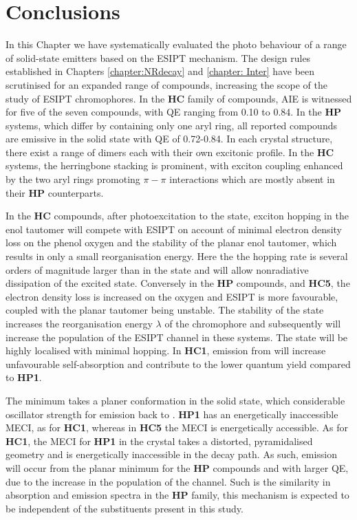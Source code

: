 \section{Conclusions}\label{section: Connecting_Conclusions}
In this Chapter we have systematically evaluated the photo behaviour of a range of solid-state emitters based on the ESIPT mechanism. The design rules established in Chapters \ref{chapter:NRdecay} and \ref{chapter: Inter} have been scrutinised for an expanded range of compounds, increasing the scope of the study of ESIPT chromophores. In the \textbf{HC} family of compounds, AIE is witnessed for five of the seven compounds, with \ac{QE} ranging from 0.10 to 0.84. In the \textbf{HP} systems, which differ by containing only one aryl ring, all reported compounds are emissive in the solid state with \ac{QE} of 0.72-0.84. In each crystal structure, there exist a range of dimers each with their own excitonic profile. In the \textbf{HC} systems, the herringbone stacking is prominent, with exciton coupling enhanced by the two aryl rings promoting $\pi-\pi$ interactions which are mostly absent in their \textbf{HP} counterparts.  

In the \textbf{HC} compounds, after photoexcitation to the \sone{} state, exciton hopping in the enol tautomer will compete with ESIPT on account of minimal electron density loss on the phenol oxygen and the stability of the planar enol tautomer, which results in only a small reorganisation energy. Here the the hopping rate is several orders of magnitude larger than in the \Kstar{} state and will allow nonradiative dissipation of the excited state. Conversely in the \textbf{HP} compounds, and \textbf{HC5}, the electron density loss is increased on the oxygen and ESIPT is more favourable, coupled with the planar \Estar{} tautomer being unstable. The stability of the \Kstar{} state increases the reorganisation energy $\lambda$ of the chromophore and subsequently will increase the population of the ESIPT channel in these systems. The \Kstar{} state will be highly localised with minimal hopping. In \textbf{HC1}, emission from \Estar{} will increase unfavourable self-absorption and contribute to the lower quantum yield compared to \textbf{HP1}.

The \Kstar{} minimum takes a planer conformation in the solid state, which considerable oscillator strength for emission back to \szero{}. \textbf{HP1} has an energetically inaccessible MECI, as for \textbf{HC1}, whereas in \textbf{HC5} the MECI is energetically accessible. As for \textbf{HC1}, the MECI for \textbf{HP1} in the crystal takes a distorted, pyramidalised geometry and is energetically inaccessible in the decay path. As such, emission will occur from the planar \Kstar{} minimum for the \textbf{HP} compounds and with larger \ac{QE}, due to the increase in the population of the \Kstar{} channel. Such is the similarity in absorption and emission spectra in the \textbf{HP} family, this mechanism is expected to be independent of the substituents present in this study. 

